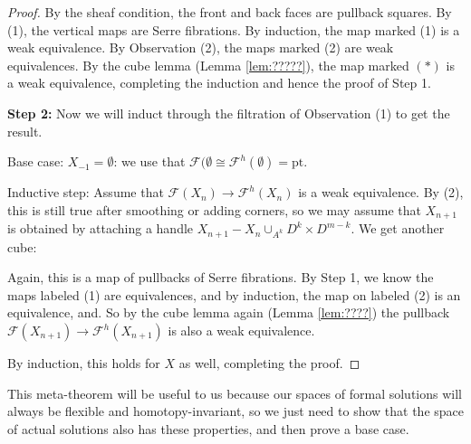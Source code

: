\documentclass{article}
\newtheorem{proposed work}[theorem]{Proposed Work}
\theoremstyle{definition}
\begin{document}
\begin{proof}
By the sheaf condition, the front and back faces are pullback squares. By (1), the vertical maps are Serre fibrations. By induction, the map marked (1) is a weak equivalence. By Observation (2), the maps marked (2) are weak equivalences. By the cube lemma (Lemma \ref{lem:?????}), the map marked $(\ast)$ is a weak equivalence, completing the induction and hence the proof of Step 1.

\textbf{Step 2:} Now we will induct through the filtration of Observation (1) to get the result.

Base case: $X_{-1} = \emptyset$: we use that $\mathcal F(\emptyset \cong \mathcal F^h(\emptyset) = \mathrm{pt}$.

Inductive step: Assume that $\mathcal F(X_n) \to \mathcal F^h(X_n)$ is a weak equivalence. By (2), this is still true after smoothing or adding corners, so we may assume that $X_{n+1}$ is obtained by attaching a handle $X_{n+1} - X_n \cup_{A^k} D^k \times D^{m-k}$. We get another cube:



Again, this is a map of pullbacks of Serre fibrations.  By Step 1, we know the maps labeled (1) are equivalences, and by induction, the map on labeled (2) is an equivalence, and. So by the cube lemma again (Lemma \ref{lem:????}) the pullback $\mathcal F(X_{n+1}) \to \mathcal F^h(X_{n+1})$ is also a weak equivalence.

By induction, this holds for $X$ as well, completing the proof.
\end{proof}


This meta-theorem will be useful to us because our spaces of formal solutions will always be flexible and homotopy-invariant, so we just need to show that the space of actual solutions also has these properties, and then prove a base case.
\end{document}
